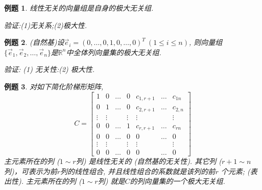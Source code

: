 \documentclass[a4paper]{book}
\newtheorem{eg}{例题}[chapter]
\begin{document}
\begin{eg}
线性无关的向量组是自身的极大无关组.

验证:(1)无关系;(2)极大性.
\end{eg}

\begin{eg}
(自然基)设$\vec{e}_i=(0,\dots,0,1,0,\dots,0)^T\ (1\leq i\leq n)$, 则向量组$\{\vec{e}_1,\vec{e}_2,\dots,\vec{e}_n\}$是$\mathbb{R}^n$中全体列向量集的极大无关组.

验证: (1) 无关性:(2) 极大性.
\end{eg}

\begin{eg}
对如下简化阶梯形矩阵,
\begin{displaymath}
C=\begin{bmatrix}1&0&\dots&0&c_{1,r+1}&\dots&c_{1n}\\0&1&\dots & 0&c_{2,r+1}&\dots&c_{2,n}\\ \vdots&\vdots&&\vdots&\vdots&&\vdots\\0&0&\dots&1&c_{r,r+1}&\dots&c_{rn}\\0& 0&\dots&0&0&\dots&0\\ \vdots&\vdots&&\vdots&\vdots&&\vdots \\0& 0&\dots&0&0&\dots&0\end{bmatrix}\end{displaymath}
主元素所在的列 ($1\sim r$列) 是线性无关的 (自然基的无关性). 其它列 ($r+1 \sim n$列)，可表示为前$r$列的线性组合,  并且线性组合的系数就是该列的前$r$ 个元素; (表出性). 主元素所在的列 ($1\sim r$列) 就是$C$的列向量集的一个极大无关组.
\end{eg}
\end{document}
